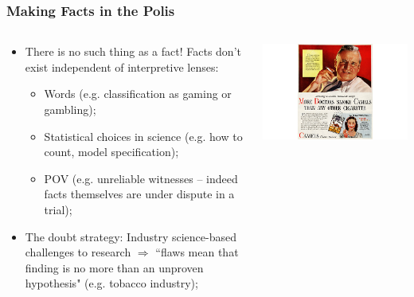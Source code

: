 \documentclass[aspectratio=169]{beamer}
\theoremstyle{principle}
\begin{document}
\begin{frame}
\frametitle{Making Facts in the Polis}

\begin{columns}
\begin{column}{0.5\textwidth}
\begin{itemize}
\item There is no such thing as a fact!  Facts don't exist independent of interpretive lenses:
\begin{itemize}
\item Words (e.g. classification as gaming or gambling);
\item Statistical choices in science (e.g. how to count, model specification);
\item POV (e.g. unreliable witnesses -- indeed facts themselves are under dispute in a trial);
\end{itemize}
\bigskip
\item The doubt strategy: Industry science-based challenges to research $\Rightarrow$ ``flaws mean that finding is no more than an unproven hypothesis" (e.g. tobacco industry);
\end{itemize}
\end{column}
\begin{column}{0.5\textwidth}
\includegraphics[scale=0.4]{smoking.jpg}
\end{column}
\end{columns}

\end{frame}
\end{document}
